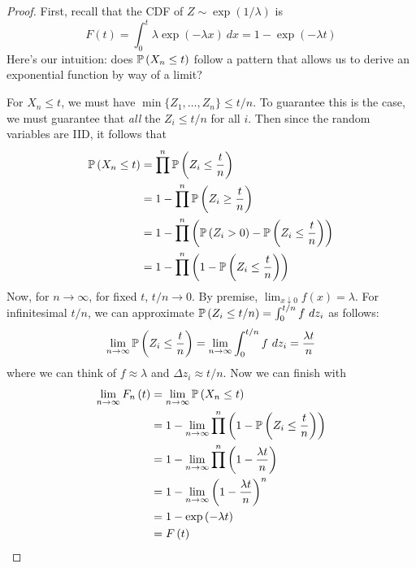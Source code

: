 \documentclass[a4paper]{article}
\begin{document}
\begin{proof}[Proof] 
First, recall that the \textsf{CDF} of \(Z \sim \exp\left( 1 / \lambda  \right)\) is
\[
	F \left( t \right) = \int^{t}_{0} \lambda \exp\left( -\lambda x \right) \ dx = 1 - \exp\left( -\lambda t \right) 
\]
Here's our intuition: does \(\mathbb{P}\left( X_{n} \le t \right)\) follow a pattern that allows us to derive an exponential function by way of a limit?

For \(X_{n} \le t\), we must have \(\min\{Z_{1}, \dots, Z_{n}\} \le t/n\). To guarantee this is the case, we must guarantee that \textit{all} the \(Z_{i} \le t/n\) for all \(i\). Then since the random variables are \textsf{IID}, it follows that
\begin{align*}
	\mathbb{P}\left( X_{n} \le t \right) & = \prod^{n} \mathbb{P}\left( Z_{i} \le \frac{t}{n} \right) \\
			& = 1 - \prod^{n} \mathbb{P}\left( Z_{i} \ge \frac{t}{n} \right) \\
			& = 1 - \prod^{n} \left( \mathbb{P}\left( Z_{i} > 0 \right) - \mathbb{P}\left( Z_{i} \le \frac{t}{n} \right) \right)  \\
			& = 1 - \prod^{n} \left( 1 - \mathbb{P}\left( Z_{i} \le \frac{t}{n} \right) \right)   
\end{align*}
Now, for \(n \rightarrow \infty\), for fixed \(t\), \(t/n \rightarrow 0 \). By premise, \(\lim_{x \downarrow 0} f \left( x \right) = \lambda \). For infinitesimal \(t/n\), we can approximate \(\mathbb{P}\left( Z_{i} \le t/n \right) = \int^{t/n}_{0} f \ dz_{i} \) as follows:
\[
	\lim_{n \to \infty} \mathbb{P}\left( Z_{i} \le \frac{t}{n} \right) = \lim_{n \to \infty} \int^{t/n}_{0} f \ dz_{i} = \frac{\lambda t}{n} 
\]
where we can think of \(f \approx \lambda \) and \(\Delta z_{i} \approx t/n\). Now we can finish with
\begin{align*}
	\lim_{n \to \infty} F_{n}\left( t \right) & = \lim_{n \to \infty} \mathbb{P}\left( X_{n} \le t \right) \\
	 & = 1 - \lim_{n \to \infty} \prod^{n} \left( 1 - \mathbb{P}\left( Z_{i}\le \frac{t}{n} \right) \right)    \\ 
	 & = 1 - \lim_{n \to \infty} \prod^{n} \left( 1 - \frac{\lambda t}{n} \right) \\
	 & = 1 - \lim_{n \to \infty} \left( 1 - \frac{\lambda t}{n} \right)^{n} \\
	 & = 1 - \exp\left( -\lambda t \right) \\
	 & = F \left( t \right) 
\end{align*}
\end{proof}
\end{document}
